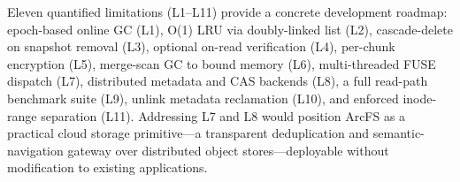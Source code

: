 \documentclass[journal]{IEEEtran}
\begin{document}
Eleven quantified limitations (L1--L11) provide a concrete development
roadmap: epoch-based online GC (L1), O(1) LRU via doubly-linked list
(L2), cascade-delete on snapshot removal (L3), optional on-read
verification (L4), per-chunk encryption (L5), merge-scan GC to bound
memory (L6), multi-threaded FUSE dispatch (L7), distributed metadata
and CAS backends (L8), a full read-path benchmark suite (L9), unlink
metadata reclamation (L10), and enforced inode-range separation (L11).
Addressing L7 and L8 would position ArcFS as a practical cloud storage
primitive---a transparent deduplication and semantic-navigation gateway
over distributed object stores---deployable without modification to
existing applications.

\balance


\end{document}
